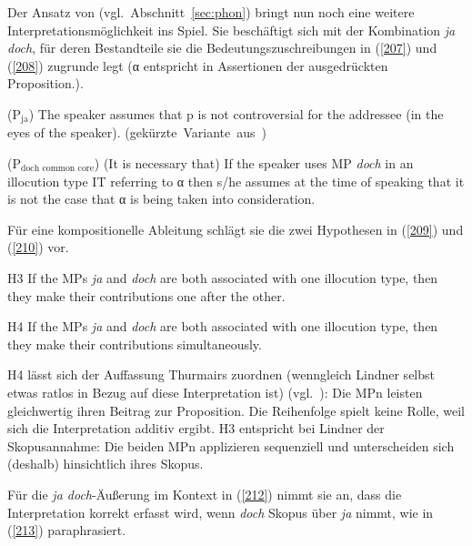 Der Ansatz von \citet{Lindner1991} (vgl.\ Abschnitt~\ref{sec:phon}) bringt nun noch eine weitere Interpretationsmöglichkeit ins Spiel. Sie beschäftigt sich mit der Kombination \textit{ja doch}, für deren Bestandteile sie die Bedeutungszuschreibungen in (\ref{207}) und (\ref{208}) zugrunde legt (α entspricht in Assertionen  der ausgedrückten Proposition.).

\begin{exe}
	\ex\label{207} 
		($\textrm{P}_{\textrm{ja}}$) The speaker assumes that p is not controversial for the addressee (in the eyes
			of the speaker).	
		\hfill\hbox{(gekürzte Variante aus \citealt[178]{Lindner1991})}
\end{exe}

\begin{exe}
	\ex\label{208} 
		($\textrm{P}_{\textrm{doch common core}}$) (It is necessary that) If the speaker uses MP \textit{doch} in an illocution type IT referring to α then s/he assumes at the time of speaking that it is not the case that α is being taken into consideration.
		\newline
		\hbox{}\hfill\hbox{\citet[190]{Lindner1991}}		
\end{exe}		
Für eine kompositionelle Ableitung schlägt sie die zwei Hypothesen in (\ref{209}) und (\ref{210}) vor.

\begin{exe}
	\ex\label{209} 
	H3 If the MPs \textit{ja} and \textit{doch} are both associated with one illocution type, then they make their contributions one after the other.
\end{exe}
	
\begin{exe}
	\ex\label{210} 
	H4 If the MPs \textit{ja} and \textit{doch} are both associated with one illocution type, then they make their contributions simultaneously.
	\hfill\hbox{\citet[194]{Lindner1991}}		
\end{exe}	
H4 lässt sich der Auffassung Thurmairs zuordnen (wenngleich Lindner selbst etwas ratlos in Bezug auf diese Interpretation ist) (vgl.\ \citealt[196]{Lindner1991}): Die MPn leisten gleichwertig ihren Beitrag zur Proposition. Die Reihenfolge spielt keine Rolle, weil sich die Interpretation additiv ergibt. H3 entspricht bei Lindner der Skopusannahme: Die beiden MPn applizieren sequenziell und unterscheiden sich (deshalb) hinsichtlich ihres Skopus. 

Für die \textit{ja doch}-Äußerung im Kontext in (\ref{212}) nimmt sie an, dass die Interpretation korrekt erfasst wird, wenn \textit{doch} Skopus  über \textit{ja} nimmt, wie in (\ref{213}) paraphrasiert.

